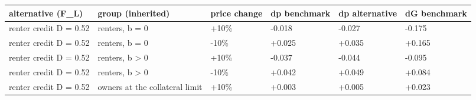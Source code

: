 \begingroup\small
\setlength{\tabcolsep}{3pt}
\renewcommand{\arraystretch}{1.04}
\begin{tabularx}{\linewidth}{XXXXXX}
\toprule
alternative (F\_L) & group (inherited) & price change & dp benchmark & dp alternative & dG benchmark \\
\midrule
renter credit D = 0.52 & renters, b = 0 & +10\% & -0.018 & -0.027 & -0.175 \\
renter credit D = 0.52 & renters, b = 0 & -10\% & +0.025 & +0.035 & +0.165 \\
renter credit D = 0.52 & renters, b \textgreater{} 0 & +10\% & -0.037 & -0.044 & -0.095 \\
renter credit D = 0.52 & renters, b \textgreater{} 0 & -10\% & +0.042 & +0.049 & +0.084 \\
renter credit D = 0.52 & owners at the collateral limit & +10\% & +0.003 & +0.005 & +0.023 \\
\bottomrule
\end{tabularx}
\endgroup
